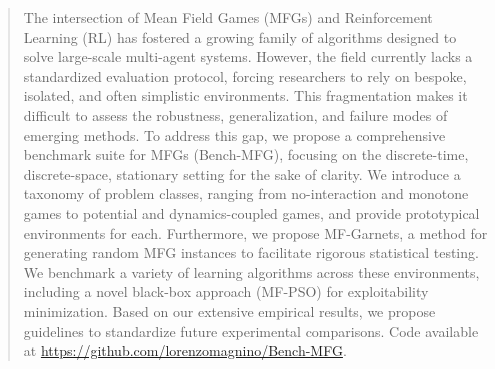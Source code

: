 \documentclass[10pt,twocolumn,letterpaper]{article}
\theoremstyle{definition}
\theoremstyle{remark}
\begin{document}

\begin{abstract}
The intersection of Mean Field Games (MFGs) and Reinforcement Learning (RL) has fostered a growing family of algorithms designed to solve large-scale multi-agent systems. However, the field currently lacks a standardized evaluation protocol, forcing researchers to rely on bespoke, isolated, and often simplistic environments. This fragmentation makes it difficult to assess the robustness, generalization, and failure modes of emerging methods. To address this gap, we propose a comprehensive benchmark suite for MFGs (Bench-MFG), focusing on the discrete-time, discrete-space, stationary setting for the sake of clarity. We introduce a taxonomy of problem classes, ranging from no-interaction and monotone games to potential and dynamics-coupled games, and provide prototypical environments for each. Furthermore, we propose MF-Garnets, a method for generating random MFG instances to facilitate rigorous statistical testing. We benchmark a variety of learning algorithms across these environments, including a novel black-box approach (MF-PSO) for exploitability minimization. Based on our extensive empirical results, we propose guidelines to standardize future experimental comparisons. Code available at \href{https://github.com/lorenzomagnino/Bench-MFG}{https://github.com/lorenzomagnino/Bench-MFG}.
\end{abstract}
\vspace{2em}
\end{document}
